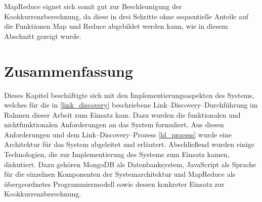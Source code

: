 MapReduce eignet sich somit gut zur Beschleunigung der Kookkurrenzberechnung, da diese in drei Schritte ohne sequentielle Anteile auf die Funktionen Map und Reduce abgebildet werden kann, wie in diesem Abschnitt gezeigt wurde.

\section{Zusammenfassung}

Dieses Kapitel beschäftigte sich mit den Implementierungsaspekten des Systems, welches für die in \cref{link_discovery} beschriebene Link--Discovery--Durchführung im Rahmen dieser Arbeit zum Einsatz kam. Dazu wurden die funktionalen und nichtfunktionalen Anforderungen an das System formuliert. Aus diesen Anforderungen und dem Link--Discovery--Prozess \cref{ld_process} wurde eine Architektur für das System abgeleitet und erläutert. Abschließend wurden einige Technologien, die zur Implementierung des Systems zum Einsatz kamen, diskutiert. Dazu gehören MongoDB als Datenbanksystem, JavaScript als Sprache für die einzelnen Komponenten der Systemarchitektur und MapReduce als übergeordnetes Programmiermodell sowie dessen konkreter Einsatz zur Kookkurrenzberechnung.